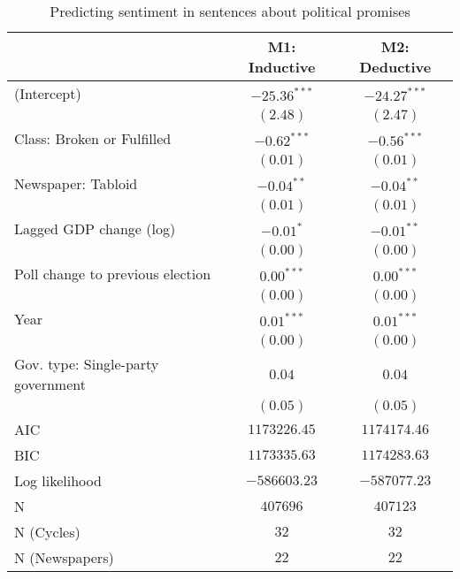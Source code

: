 
\begin{table}[!h]
\caption{Predicting sentiment in sentences about political promises}
\begin{center}
\begin{footnotesize}
\begin{tabular}{l c c}
\hline
 & M1: Inductive & M2: Deductive \\
\hline
(Intercept)                        & $-25.36^{***}$ & $-24.27^{***}$ \\
                                   & $(2.48)$       & $(2.47)$       \\
Class: Broken or Fulfilled         & $-0.62^{***}$  & $-0.56^{***}$  \\
                                   & $(0.01)$       & $(0.01)$       \\
Newspaper: Tabloid                 & $-0.04^{**}$   & $-0.04^{**}$   \\
                                   & $(0.01)$       & $(0.01)$       \\
Lagged GDP change (log)            & $-0.01^{*}$    & $-0.01^{**}$   \\
                                   & $(0.00)$       & $(0.00)$       \\
Poll change to previous election   & $0.00^{***}$   & $0.00^{***}$   \\
                                   & $(0.00)$       & $(0.00)$       \\
Year                               & $0.01^{***}$   & $0.01^{***}$   \\
                                   & $(0.00)$       & $(0.00)$       \\
Gov. type: Single-party government & $0.04$         & $0.04$         \\
                                   & $(0.05)$       & $(0.05)$       \\
\hline
AIC                                & $1173226.45$   & $1174174.46$   \\
BIC                                & $1173335.63$   & $1174283.63$   \\
Log likelihood                     & $-586603.23$   & $-587077.23$   \\
N                                  & $407696$       & $407123$       \\
N (Cycles)                         & $32$           & $32$           \\
N (Newspapers)                     & $22$           & $22$           \\

\end{tabular}
\end{footnotesize}
\end{center}
\end{table}
